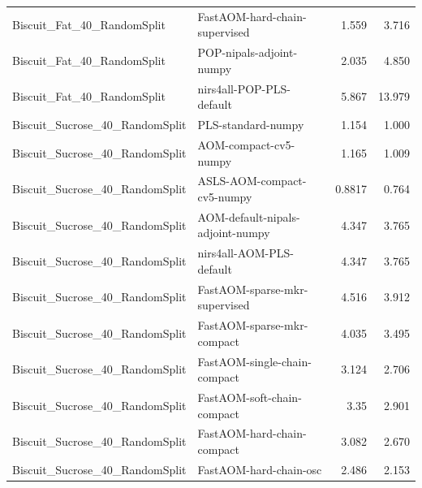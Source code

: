 \begin{landscape}
\begin{longtable}{L{8.0cm}L{9.5cm}rr}
Biscuit\_\allowbreak{}Fat\_\allowbreak{}40\_\allowbreak{}RandomSplit & FastAOM-\allowbreak{}hard-\allowbreak{}chain-\allowbreak{}supervised & 1.559 & 3.716 \\
Biscuit\_\allowbreak{}Fat\_\allowbreak{}40\_\allowbreak{}RandomSplit & POP-\allowbreak{}nipals-\allowbreak{}adjoint-\allowbreak{}numpy & 2.035 & 4.850 \\
Biscuit\_\allowbreak{}Fat\_\allowbreak{}40\_\allowbreak{}RandomSplit & nirs4all-\allowbreak{}POP-\allowbreak{}PLS-\allowbreak{}default & 5.867 & 13.979 \\
Biscuit\_\allowbreak{}Sucrose\_\allowbreak{}40\_\allowbreak{}RandomSplit & PLS-\allowbreak{}standard-\allowbreak{}numpy & 1.154 & 1.000 \\
Biscuit\_\allowbreak{}Sucrose\_\allowbreak{}40\_\allowbreak{}RandomSplit & AOM-\allowbreak{}compact-\allowbreak{}cv5-\allowbreak{}numpy & 1.165 & 1.009 \\
Biscuit\_\allowbreak{}Sucrose\_\allowbreak{}40\_\allowbreak{}RandomSplit & ASLS-\allowbreak{}AOM-\allowbreak{}compact-\allowbreak{}cv5-\allowbreak{}numpy & 0.8817 & 0.764 \\
Biscuit\_\allowbreak{}Sucrose\_\allowbreak{}40\_\allowbreak{}RandomSplit & AOM-\allowbreak{}default-\allowbreak{}nipals-\allowbreak{}adjoint-\allowbreak{}numpy & 4.347 & 3.765 \\
Biscuit\_\allowbreak{}Sucrose\_\allowbreak{}40\_\allowbreak{}RandomSplit & nirs4all-\allowbreak{}AOM-\allowbreak{}PLS-\allowbreak{}default & 4.347 & 3.765 \\
Biscuit\_\allowbreak{}Sucrose\_\allowbreak{}40\_\allowbreak{}RandomSplit & FastAOM-\allowbreak{}sparse-\allowbreak{}mkr-\allowbreak{}supervised & 4.516 & 3.912 \\
Biscuit\_\allowbreak{}Sucrose\_\allowbreak{}40\_\allowbreak{}RandomSplit & FastAOM-\allowbreak{}sparse-\allowbreak{}mkr-\allowbreak{}compact & 4.035 & 3.495 \\
Biscuit\_\allowbreak{}Sucrose\_\allowbreak{}40\_\allowbreak{}RandomSplit & FastAOM-\allowbreak{}single-\allowbreak{}chain-\allowbreak{}compact & 3.124 & 2.706 \\
Biscuit\_\allowbreak{}Sucrose\_\allowbreak{}40\_\allowbreak{}RandomSplit & FastAOM-\allowbreak{}soft-\allowbreak{}chain-\allowbreak{}compact & 3.35 & 2.901 \\
Biscuit\_\allowbreak{}Sucrose\_\allowbreak{}40\_\allowbreak{}RandomSplit & FastAOM-\allowbreak{}hard-\allowbreak{}chain-\allowbreak{}compact & 3.082 & 2.670 \\
Biscuit\_\allowbreak{}Sucrose\_\allowbreak{}40\_\allowbreak{}RandomSplit & FastAOM-\allowbreak{}hard-\allowbreak{}chain-\allowbreak{}osc & 2.486 & 2.153 \\

\end{longtable}
\end{landscape}
